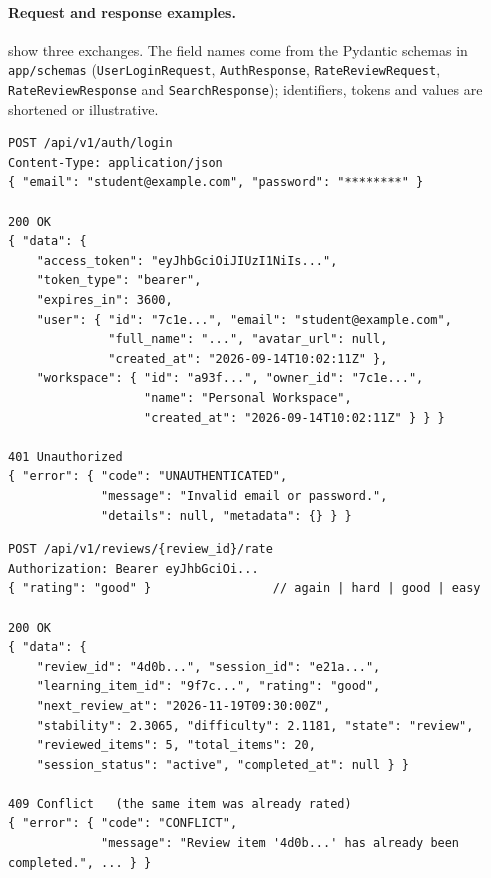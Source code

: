 \paragraph{Request and response examples.}
 show three exchanges. The field names come
from the Pydantic schemas in \texttt{app/schemas} (\texttt{UserLoginRequest},
\texttt{AuthResponse}, \texttt{RateReviewRequest}, \texttt{RateReviewResponse} and
\texttt{SearchResponse}); identifiers, tokens and values are shortened or illustrative.

\begin{lstlisting}[caption={Login (\texttt{auth.py}; \texttt{UserLoginRequest} $\rightarrow$ \texttt{ResponseEnvelope[AuthResponse]})},label={lst:api_login}]
POST /api/v1/auth/login
Content-Type: application/json
{ "email": "student@example.com", "password": "********" }

200 OK
{ "data": {
    "access_token": "eyJhbGciOiJIUzI1NiIs...",
    "token_type": "bearer",
    "expires_in": 3600,
    "user": { "id": "7c1e...", "email": "student@example.com",
              "full_name": "...", "avatar_url": null,
              "created_at": "2026-09-14T10:02:11Z" },
    "workspace": { "id": "a93f...", "owner_id": "7c1e...",
                   "name": "Personal Workspace",
                   "created_at": "2026-09-14T10:02:11Z" } } }

401 Unauthorized
{ "error": { "code": "UNAUTHENTICATED",
             "message": "Invalid email or password.",
             "details": null, "metadata": {} } }
\end{lstlisting}

\begin{lstlisting}[caption={Rate a review item (\texttt{reviews.py}; \texttt{RateReviewRequest} $\rightarrow$ \texttt{RateReviewResponse})},label={lst:api_rate}]
POST /api/v1/reviews/{review_id}/rate
Authorization: Bearer eyJhbGciOi...
{ "rating": "good" }                 // again | hard | good | easy

200 OK
{ "data": {
    "review_id": "4d0b...", "session_id": "e21a...",
    "learning_item_id": "9f7c...", "rating": "good",
    "next_review_at": "2026-11-19T09:30:00Z",
    "stability": 2.3065, "difficulty": 2.1181, "state": "review",
    "reviewed_items": 5, "total_items": 20,
    "session_status": "active", "completed_at": null } }

409 Conflict   (the same item was already rated)
{ "error": { "code": "CONFLICT",
             "message": "Review item '4d0b...' has already been completed.", ... } }
\end{lstlisting}

